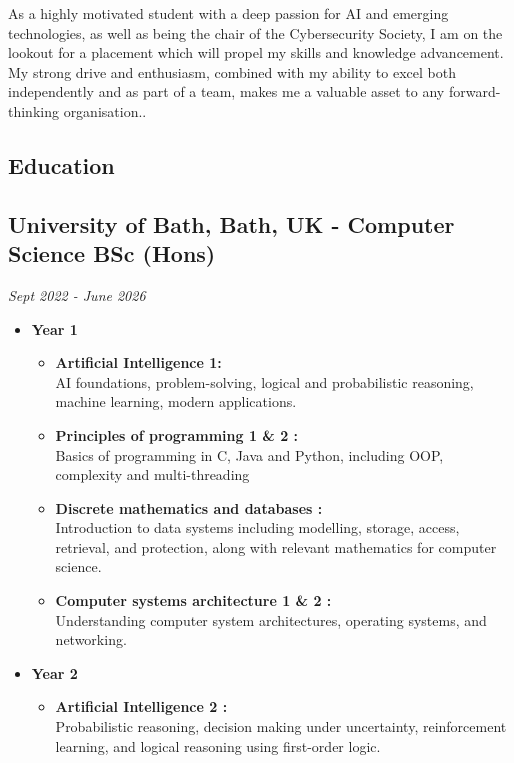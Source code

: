 \documentclass[11pt,a4paper,sans]{moderncv}        %
\begin{document}
\makecvtitle
\vspace{-\baselineskip}
\vspace{-\baselineskip}
\small{As a highly motivated student with a deep passion for AI and emerging technologies, as well as being the chair of the Cybersecurity Society, I am on the lookout for a placement which will propel my skills and knowledge advancement. My strong drive and enthusiasm, combined with my ability to excel both independently and as part of a team, makes me a valuable asset to any forward-thinking organisation..}

\begin{multicols}{2}
\section{Education}
\subsection{University of Bath, Bath, UK - Computer Science BSc (Hons)}
\textit{Sept 2022 - June 2026}
\begin{itemize}
    \item {
            \textbf{Year 1 }
            \begin{itemize}
                \item \textbf{Artificial  Intelligence 1:} \\
                 AI foundations, problem-solving, logical and probabilistic reasoning, machine learning, modern applications.
                \item \textbf{Principles of programming 1 \& 2 :} \\
                Basics of programming in C, Java and Python, including OOP, complexity and multi-threading
                \item \textbf{Discrete mathematics and databases :} \\
               Introduction to data systems including modelling, storage, access, retrieval, and protection, along with relevant mathematics for computer science.
                \item \textbf{Computer systems architecture 1 \& 2 :} \\
               Understanding computer system architectures, operating systems, and networking.
            \end{itemize} 
        }
    \item {
             \textbf{Year 2}
            \begin{itemize}
                \item \textbf{Artificial  Intelligence 2 :}\\
                Probabilistic reasoning, decision making under uncertainty, reinforcement learning, and logical reasoning using first-order logic.
                

\end{itemize}}
\end{itemize}
\end{multicols}
\end{document}
